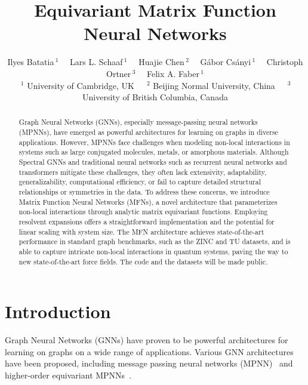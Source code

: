 \documentclass{article} \usepackage{iclr2024_conference,times}
\title{\Large Equivariant Matrix Function Neural Networks}
\author{Ilyes Batatia$\, ^1$ \ \
Lars L. Schaaf$\, ^1$ \ \
Huajie Chen$\, ^2$ \ \
Gábor Csányi$\, ^1$ \ \
Christoph Ortner$\, ^3$ \ \
Felix A. Faber$\, ^1$  \\
\small{$\, ^1$ University of Cambridge, UK \ \ 
$\, ^2$ Beijing Normal University, China  \ \
$\, ^3$ University of British Columbia, Canada }
}
\begin{document}
\maketitle

\begin{abstract}

Graph Neural Networks (GNNs), especially message-passing neural networks (MPNNs), have emerged as powerful architectures for learning on graphs in diverse applications. However, MPNNs face challenges when modeling non-local interactions in systems such as large conjugated molecules, metals, or amorphous materials. 
Although Spectral GNNs and traditional neural networks such as recurrent neural networks and transformers mitigate these challenges, they often lack extensivity, adaptability, generalizability, computational efficiency, or fail to capture detailed structural relationships or symmetries in the data. To address these concerns, we introduce Matrix Function Neural Networks (MFNs), a novel architecture that parameterizes non-local interactions through analytic matrix equivariant functions. Employing resolvent expansions offers a straightforward implementation and the potential for linear scaling with system size.
The MFN architecture achieves state-of-the-art performance in standard graph benchmarks, such as the ZINC and TU datasets, and is able to capture intricate non-local interactions in quantum systems, paving the way to new state-of-the-art force fields. The code and the datasets will be made public.

\end{abstract}

\section{Introduction}

Graph Neural Networks (GNNs) have proven to be powerful architectures for learning on graphs on a wide range of applications. Various GNN architectures have been proposed, including message passing neural networks (MPNN)~\citep{gilmer2017neural, battaglia2018relational, kipf2016semi, velivckovic2017graph, wu2020comprehensive, deepmind2018protein, hu2019deep, nequip} and higher-order equivariant MPNNs~\citep{Batatia2022mace}. 
\end{document}
